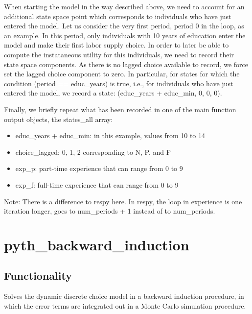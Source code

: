 \documentclass[letterpaper,10pt,english]{sphinxmanual}
\begin{document}
When starting the model in the way described above, we need to account for an additional state space point which corresponds to individuals who have just entered the model. Let us consider the very first period, period 0 in the loop, as an example. In this period, only individuals with 10 years of education enter the model and make their first labor supply choice. In order to later be able to compute the instataneous utility for this individuals, we need to record their state space components. As there is no lagged choice available to record, we force set the lagged choice component to zero. In particular, for states for which the condition (period == educ\_years) is true, i.e., for individuals who have just entered the model, we record a state: (educ\_years + educ\_min, 0, 0, 0).

Finally, we briefly repeat what has been recorded in one of the main function output objects, the states\_all array:
\begin{itemize}
\item {} 
educ\_years + educ\_min: in this example, values from 10 to 14

\item {} 
choice\_lagged: 0, 1, 2 corresponding to N, P, and F

\item {} 
exp\_p: part-time experience that can range from 0 to 9

\item {} 
exp\_f: full-time experience that can range from 0 to 9

\end{itemize}

Note: There is a difference to respy here. In respy, the loop in experience is one iteration longer, goes to num\_periods + 1 instead of to num\_periods.


\section{pyth\_backward\_induction}
\label{\detokenize{developer_docs:pyth-backward-induction}}

\subsection{Functionality}
\label{\detokenize{developer_docs:id1}}
Solves the dynamic discrete choice model in a backward induction procedure, in which the error terms are integrated out in a Monte Carlo simulation procedure.
\end{document}
